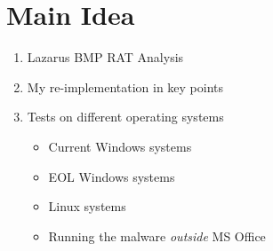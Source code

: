 \chapter{Main Idea}
\begin{enumerate}
  \item Lazarus BMP RAT Analysis
  \item My re-implementation in key points
  \item Tests on different operating systems
    \begin{itemize}
      \item Current Windows systems
      \item EOL Windows systems
      \item Linux systems
      \item Running the malware \emph{outside} MS Office
    \end{itemize}
\end{enumerate}


